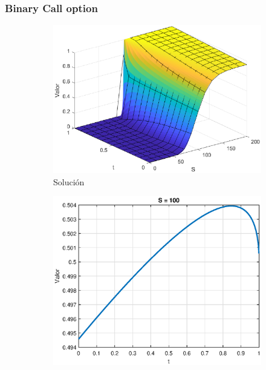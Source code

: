 \subsubsection{Binary Call option}
\begin{figure}[H]
    \centering
    \begin{subfigure}[b]{0.35\linewidth}
        \includegraphics[width=\linewidth]{Imagenes/Parte1/6_Sols/Binary_Call/BinaryCall3D.eps}
        \caption{Solución}
    \end{subfigure}
    \begin{subfigure}[b]{0.35\linewidth}
        \includegraphics[width=\linewidth]{Imagenes/Parte1/6_Sols/Binary_Call/BinaryCallSFijo.eps}

\end{subfigure}
\end{figure}
